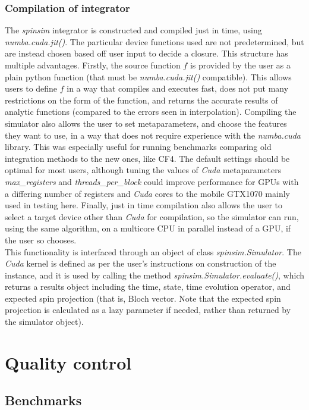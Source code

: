 \documentclass{jors}
\begin{document}
		\subsubsection*{Compilation of integrator}
			The \emph{spinsim} integrator is constructed and compiled just in time, using \emph{numba.cuda.jit()}. The particular device functions used are not predetermined, but are instead chosen based off user input to decide a closure. This structure has multiple advantages. Firstly, the source function \(f\) is provided by the user as a plain python function (that must be \emph{numba.cuda.jit()} compatible). This allows users to define \(f\) in a way that compiles and executes fast, does not put many restrictions on the form of the function, and returns the accurate results of analytic functions (compared to the errors seen in interpolation). Compiling the simulator also allows the user to set metaparameters, and choose the features they want to use, in a way that does not require experience with the \emph{numba.cuda} library. This was especially useful for running benchmarks comparing old integration methods to the new ones, like CF4. The default settings should be optimal for most users, although tuning the values of \emph{Cuda} metaparameters \emph{max\_registers} and \emph{threads\_per\_block} could improve performance for GPUs with a differing number of registers and \emph{Cuda} cores to the mobile GTX1070 mainly used in testing here. Finally, just in time compilation also allows the user to select a target device other than \emph{Cuda} for compilation, so the simulator can run, using the same algorithm, on a multicore CPU in parallel instead of a GPU, if the user so chooses.\\
			
			This functionality is interfaced through an object of class \emph{spinsim.Simulator}. The \emph{Cuda} kernel is defined as per the user’s instructions on construction of the instance, and it is used by calling the method \emph{spinsim.Simulator.evaluate()}, which returns a results object including the time, state, time evolution operator, and expected spin projection (that is, Bloch vector. Note that the expected spin projection is calculated as a lazy parameter if needed, rather than returned by the simulator object).

\section*{Quality control}
	\subsection*{Benchmarks}
\end{document}

